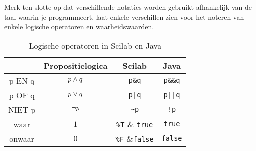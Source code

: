 Merk ten slotte op dat verschillende notaties worden gebruikt afhankelijk van de taal waarin je programmeert.  laat enkele verschillen zien voor het noteren van enkele logische operatoren en waarheidswaarden.
\begin{table}
\caption{Logische operatoren in Scilab en Java}
\label{tab:log_op_sci_java}
\centering
\begin{tabular}{cccc}
\toprule & Propositielogica & Scilab & Java \\
\midrule
p EN q & $p\wedge q$ & \verb+p&q+ & \verb+p&&q+ \\
p OF q & $p\vee q$ & \verb+p|q+ &\verb+p||q+\\
NIET p & $\neg p$ &\verb+~p+ & \verb+!p+ \\
waar & $1$ & \verb+%T+ & \verb+true+\\
onwaar & $0$ & \verb+%F+ &\verb+false+\\
\bottomrule
\end{tabular}
\end{table}





